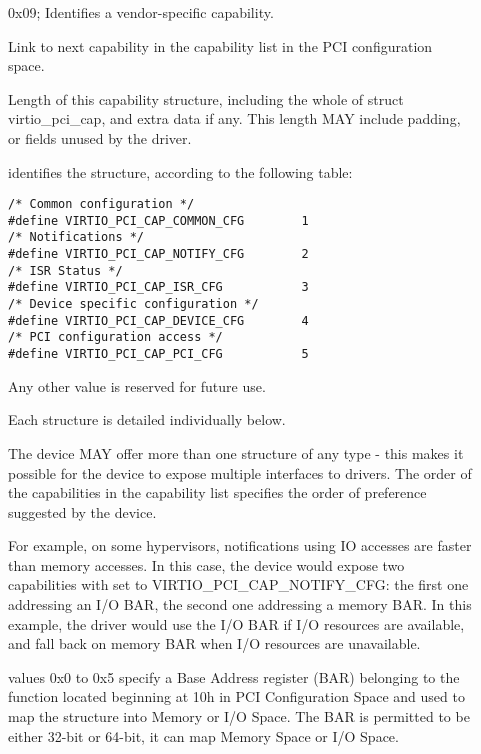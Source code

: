 \begin{description}
\item[]
        0x09; Identifies a vendor-specific capability.

\item[]
        Link to next capability in the capability list in the PCI configuration space.

\item[]
        Length of this capability structure, including the whole of
        struct virtio_pci_cap, and extra data if any.
        This length MAY include padding, or fields unused by the driver.

\item[]
        identifies the structure, according to the following table:

\begin{lstlisting}
/* Common configuration */
#define VIRTIO_PCI_CAP_COMMON_CFG        1
/* Notifications */
#define VIRTIO_PCI_CAP_NOTIFY_CFG        2
/* ISR Status */
#define VIRTIO_PCI_CAP_ISR_CFG           3
/* Device specific configuration */
#define VIRTIO_PCI_CAP_DEVICE_CFG        4
/* PCI configuration access */
#define VIRTIO_PCI_CAP_PCI_CFG           5
\end{lstlisting}

        Any other value is reserved for future use.

        Each structure is detailed individually below.

        The device MAY offer more than one structure of any type - this makes it
        possible for the device to expose multiple interfaces to drivers.  The order of
        the capabilities in the capability list specifies the order of preference
        suggested by the device.
        \begin{note}
          For example, on some hypervisors, notifications using IO accesses are
        faster than memory accesses. In this case, the device would expose two
        capabilities with  set to VIRTIO_PCI_CAP_NOTIFY_CFG:
        the first one addressing an I/O BAR, the second one addressing a memory BAR.
        In this example, the driver would use the I/O BAR if I/O resources are available, and fall back on
        memory BAR when I/O resources are unavailable.
        \end{note}

\item[]
        values 0x0 to 0x5 specify a Base Address register (BAR) belonging to
        the function located beginning at 10h in PCI Configuration Space
        and used to map the structure into Memory or I/O Space.
        The BAR is permitted to be either 32-bit or 64-bit, it can map Memory Space
        or I/O Space.


\end{description}
